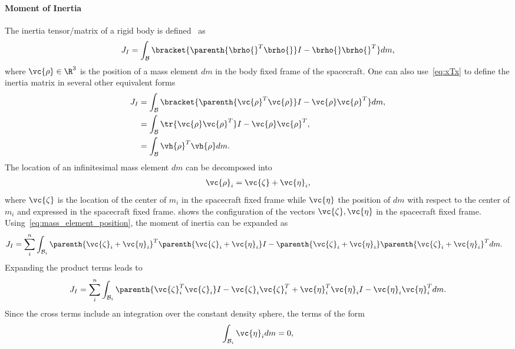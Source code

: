 \paragraph{Moment of Inertia}\label{sec:moment_of_inertia}
The inertia tensor/matrix of a rigid body is defined~\cite{greenwood1988} as
\begin{align}\label{eq:moi_definition}
    J_I = \int_{\mathcal{B}} \bracket{ \parenth{\brho{}^T \brho{} }I - \brho{}\brho{}^T} dm, 
\end{align}
where \( \vc{\rho} \in \R^3 \) is the position of a mass element \( dm \) in the body fixed frame of the spacecraft.
One can also use~\cref{eq:xTx} to define the inertia matrix in several other equivalent forms
\begin{align*}
    J_I &= \int_{\mathcal{B}} \bracket{ \parenth{\vc{\rho}^T \vc{\rho} }I - \vc{\rho}\vc{\rho}^T} dm, \\
        &= \int_{\mathcal{B}} \tr{\vc{\rho}\vc{\rho}^T} I - \vc{\rho}\vc{\rho}^T, \\
        &= \int_{\mathcal{B}} \vh{\rho}^T \vh{\rho} dm.
\end{align*}
The location of an infinitesimal mass element \( dm \) can be decomposed into
\begin{align}\label{eq:mass_element_position}
    \vc{\rho}_i = \vc{\zeta} + \vc{\eta}_i, 
\end{align}
where \( \vc{\zeta} \) is the location of the center of \( m_i \) in the spacecraft fixed frame while \( \vc{\eta} \) the position of \( dm \) with respect to the center of \( m_i \) and expressed in the spacecraft fixed frame.
 shows the configuration of the vectors \( \vc{\zeta}, \vc{\eta} \) in the spacecraft fixed frame.
Using~\cref{eq:mass_element_position}, the moment of inertia can be expanded as
\begin{align*}
    J_I &= \sum_i^n \int_{\mathcal{B}_i} \parenth{\vc{\zeta}_i + \vc{\eta}_i}^T \parenth{\vc{\zeta}_i + \vc{\eta}_i } I  - \parenth{\vc{\zeta}_i + \vc{\eta}_i} \parenth{\vc{\zeta}_i + \vc{\eta}_i}^T dm .
\end{align*}
Expanding the product terms leads to
\begin{align*}
    J_I = \sum_i^n \int_{\mathcal{B}_i} \parenth{\vc{\zeta}_i^T \vc{\zeta}_i}I - \vc{\zeta}_i \vc{\zeta}_i^T + \vc{\eta}_i^T \vc{\eta}_i I - \vc{\eta}_i \vc{\eta}_i^T dm.
\end{align*}
Since the cross terms include an integration over the constant density sphere, the terms of the form
\begin{align*}
    \int_{\mathcal{B}_i} \vc{\eta}_i dm = 0,
\end{align*}
